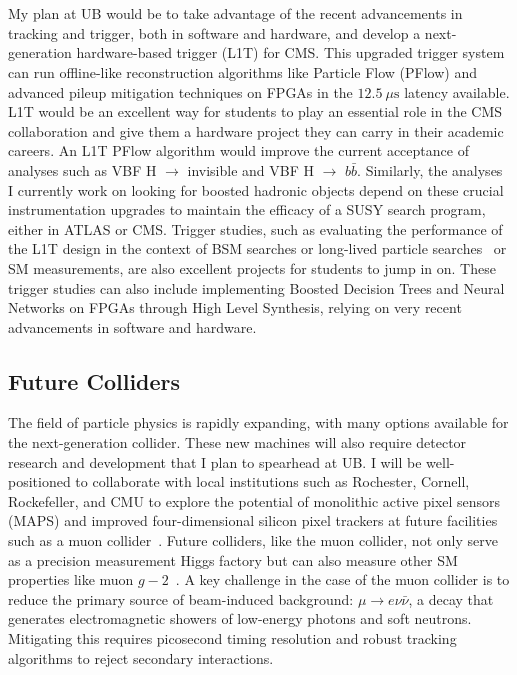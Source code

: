 \documentclass[10pt,a4paper,sans]{moderncv} %
\begin{document}
\\
\\
My plan at UB would be to take advantage of the recent advancements in tracking and trigger, both in software and hardware, and develop a next-generation hardware-based trigger (L1T) for CMS. This upgraded trigger system can run offline-like reconstruction algorithms like Particle Flow (PFlow) and advanced pileup mitigation techniques on FPGAs in the $12.5~\mu\mathrm{s}$ latency available. L1T would be an excellent way for students to play an essential role in the CMS collaboration and give them a hardware project they can carry in their academic careers. An L1T PFlow algorithm would improve the current acceptance of analyses such as VBF H $\to$ invisible and VBF H $\to$ $b\bar{b}$. Similarly, the analyses I currently work on looking for boosted hadronic objects depend on these crucial instrumentation upgrades to maintain the efficacy of a SUSY search program, either in ATLAS or CMS. Trigger studies, such as evaluating the performance of the L1T design in the context of BSM searches or long-lived particle searches~\cite{CMS:2018jid} or SM measurements, are also excellent projects for students to jump in on. These trigger studies can also include implementing Boosted Decision Trees and Neural Networks on FPGAs through High Level Synthesis, relying on very recent advancements in software and hardware.

\subsection{Future Colliders}
The field of particle physics is rapidly expanding, with many options available for the next-generation collider. These new machines will also require detector research and development that I plan to spearhead at UB. I will be well-positioned to collaborate with local institutions such as Rochester, Cornell, Rockefeller, and CMU to explore the potential of monolithic active pixel sensors (MAPS) and improved four-dimensional silicon pixel trackers at future facilities such as a muon collider~\cite{Black:2022cth}. Future colliders, like the muon collider, not only serve as a precision measurement Higgs factory but can also measure other SM properties like muon $g-2$~\cite{Chakraborti:2021dli}. A key challenge in the case of the muon collider is to reduce the primary source of beam-induced background: $\mu \to e \nu \bar{\nu}$, a decay that generates electromagnetic showers of low-energy photons and soft neutrons. Mitigating this requires picosecond timing resolution and robust tracking algorithms to reject secondary interactions.
\end{document}
